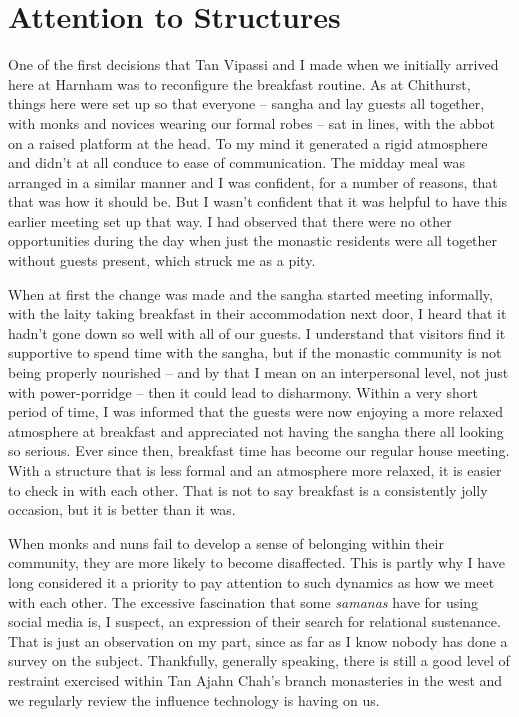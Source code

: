 \section{Attention to Structures}

One of the first decisions that Tan Vipassi and I made when we initially
arrived here at Harnham was to reconfigure the breakfast routine. As at
Chithurst, things here were set up so that everyone -- sangha and lay
guests all together, with monks and novices wearing our formal robes --
sat in lines, with the abbot on a raised platform at the head. To my
mind it generated a rigid atmosphere and didn't at all conduce to ease
of communication. The midday meal was arranged in a similar manner and I
was confident, for a number of reasons, that that was how it should be.
But I wasn't confident that it was helpful to have this earlier meeting
set up that way. I had observed that there were no other opportunities
during the day when just the monastic residents were all together
without guests present, which struck me as a pity.

When at first the change was made and the sangha started meeting
informally, with the laity taking breakfast in their accommodation next
door, I heard that it hadn't gone down so well with all of our guests. I
understand that visitors find it supportive to spend time with the
sangha, but if the monastic community is not being properly nourished --
and by that I mean on an interpersonal level,
not just with power-porridge\cite{porridge}
-- then it could lead to disharmony. Within a very short
period of time, I was informed that the guests were now enjoying a more
relaxed atmosphere at breakfast and appreciated not having the sangha
there all looking so serious. Ever since then, breakfast time has become
our regular house meeting. With a structure that is less formal and an
atmosphere more relaxed, it is easier to check in with each other. That
is not to say breakfast is a consistently jolly occasion, but it is
better than it was.

\enlargethispage{\baselineskip}

When monks and nuns fail to develop a sense of belonging within their
community, they are more likely to become disaffected. This is partly
why I have long considered it a priority to pay attention to such
dynamics as how we meet with each other. The excessive fascination that
some \emph{samanas} have for using social media is, I suspect, an
expression of their search for relational sustenance.
That is just an observation on my part, since as far as I
know nobody has done a survey on the subject. Thankfully, generally
speaking, there is still a good level of restraint exercised within Tan
Ajahn Chah's branch monasteries in the west and we regularly review the
influence technology is having on us.


